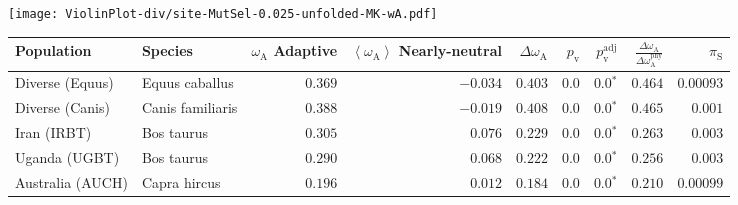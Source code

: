 \begin{center}
\texttt{[image: ViolinPlot-div/site-MutSel-0.025-unfolded-MK-wA.pdf]} 
\begin{adjustbox}{width = 1\textwidth}
\begin{tabular}{|l|l|r|r|r|r|r|r|r|}
\toprule
                     Population &              Species & \specialcell{$\omega_{\mathrm{A}}$ \\ Adaptive} & \specialcell{$\left< \omega_{\mathrm{A}} \right>$ \\ Nearly-neutral} & $\Delta \omega_{\mathrm{A}} $ & $p_{\mathrm{v}}$ & $p_{\mathrm{v}}^{\mathrm{adj}}$ & $\frac{\Delta\omega_{\mathrm{A}}}{\Delta\omega_{\mathrm{A}}^{\mathrm{phy}}}$ & $\pi_{\textrm{S}}$ \\
\midrule
                Diverse (Equus) &       Equus caballus &                                        $ 0.369$ &                                           $-0.034$ &                      $ 0.403$ &            $0.0$ &                  $\bm{0.0{^*}}$ &                                           $ 0.464$ &          $0.00093$ \\
                Diverse (Canis) &     Canis familiaris &                                        $ 0.388$ &                                           $-0.019$ &                      $ 0.408$ &            $0.0$ &                  $\bm{0.0{^*}}$ &                                           $ 0.465$ &           $ 0.001$ \\
                    Iran (IRBT) &           Bos taurus &                                        $ 0.305$ &                                           $ 0.076$ &                      $ 0.229$ &            $0.0$ &                  $\bm{0.0{^*}}$ &                                           $ 0.263$ &           $ 0.003$ \\
                  Uganda (UGBT) &           Bos taurus &                                        $ 0.290$ &                                           $ 0.068$ &                      $ 0.222$ &            $0.0$ &                  $\bm{0.0{^*}}$ &                                           $ 0.256$ &           $ 0.003$ \\
               Australia (AUCH) &         Capra hircus &                                        $ 0.196$ &                                           $ 0.012$ &                      $ 0.184$ &            $0.0$ &                  $\bm{0.0{^*}}$ &                                           $ 0.210$ &          $0.00099$ \\

\end{tabular}
\end{adjustbox}
\end{center}
